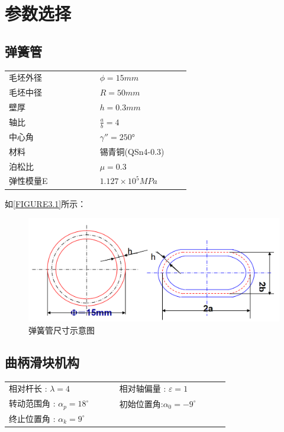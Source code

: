 \section{参数选择}
\subsection{弹簧管}
\begin{tabular}{@{}>{\raggedright\arraybackslash}p{0.4\linewidth}>{\centering\arraybackslash}p{0.4\linewidth}@{}}
    毛坯外径 & $\phi = 15mm$ \\
    毛坯中径 & $R = 50mm$ \\
    壁厚 & $h = 0.3mm$ \\
    轴比 & $\frac{a}{b} = 4$ \\
    中心角 & $\gamma'' = 250°$ \\
    材料 & 锡青铜(QSn4-0.3) \\
    泊松比 & $\mu = 0.3$ \\
    弹性模量E & $1.127 \times 10^5MPa$
\end{tabular}
\newline

如\autoref{FIGURE3.1}所示：
\begin{figure}[!htbp]
    \centering
    \includegraphics[width =\textwidth]{figures/3.1.png}
    \caption{弹簧管尺寸示意图}
    \label{FIGURE3.1}
\end{figure}
\subsection{曲柄滑块机构}
\begin{tabular}{@{}>{\raggedright\arraybackslash}p{0.4\linewidth}>{\raggedright\arraybackslash}p{0.4\linewidth}@{}}
相对杆长 : $\lambda=4$ &相对轴偏量 : $\varepsilon=1$\\
转动范围角 : $\alpha_p=18^\circ$ &初始位置角:$\alpha_0=-9^\circ$\\
终止位置角 : $\alpha_k=9^\circ$ &
\end{tabular}

